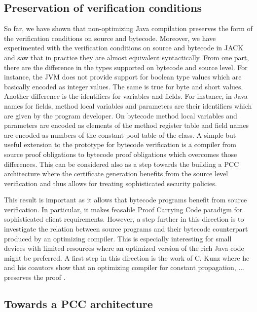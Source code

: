  
\subsection{Preservation of verification conditions}

So far, we have shown that non-optimizing Java compilation
 preserves the  form of the verification conditions on source and
 bytecode. 
Moreover, we have experimented with the verification conditions on source and
 bytecode in JACK and saw that in practice they are almost equivalent
 syntactically. From one part, there are the difference in the types 
 supported on bytecode and source level. For instance, the JVM does not
 provide support for boolean type values which are basically encoded as
 integer values. The same is true for byte and short values.  Another
 difference is the identifiers for variables and fields. For instance, in Java
 names for fields, method local variables and parameters are their identifiers which are given by the
 program developer. On bytecode method local variables and parameters are encoded as elements of the
 method register table and field names are encoded as numbers of the constant
 pool table of the class. A  simple but useful extension to the prototype for
 bytecode verification is a compiler from source proof obligations to bytecode proof obligations
 which overcomes those differences. This can be considered also as a step
 towards the  building a PCC architecture where the certificate generation benefits from
 the source level verification and thus allows for treating sophisticated
 security policies.

This result is important as it allows that bytecode programs  benefit from source verification. In particular, it makes
feasable Proof Carrying Code paradigm for sophisticated client requirements. However, a step further in this direction is to investigate the 
relation between source programs and their bytecode counterpart produced by an optimizing compiler. 
 This is especially  interesting for small devices with limited resources  where an optimized version of the rich Java code might be preferred. 
A first step in this direction is the work of C. Kunz \cite{BGKRsas06} where he and his coautors show that an optimizing compiler for constant propagation, ... 
preserves the proof .

\subsection{Towards a PCC architecture}

